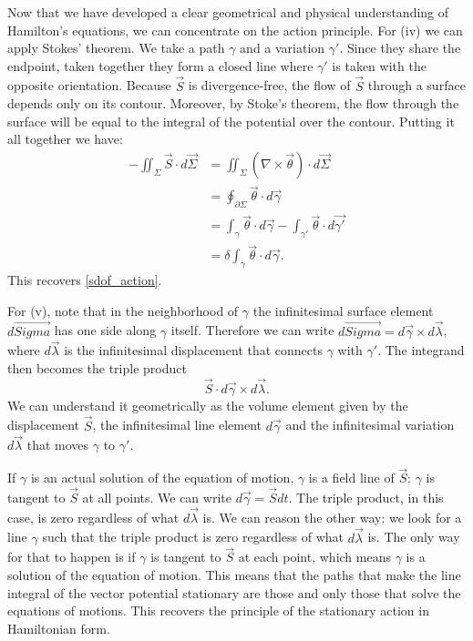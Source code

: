 \documentclass[10pt,twocolumn, nofootinbib]{revtex4-2}
\begin{document}
Now that we have developed a clear geometrical and physical understanding of Hamilton's equations, we can concentrate on the action principle. For (iv) we can apply Stokes' theorem. We take a path $\gamma$ and a variation $\gamma'$. Since they share the endpoint, taken together they form a closed line where $\gamma'$ is taken with the opposite orientation. Because $\vec{S}$ is divergence-free, the flow of $\vec{S}$ through a surface depends only on its contour. Moreover, by Stoke's theorem, the flow through the surface will be equal to the integral of the potential over the contour. Putting it all together we have:
\begin{align*}
	- \iint_{\Sigma} \vec{S} \cdot d\vec{\Sigma} &=
	\iint_{\Sigma} \left( \nabla \times \vec{\theta} \right) \cdot d\vec{\Sigma} \\
	&= \oint_{\partial \Sigma} \vec{\theta}  \cdot d\vec{\gamma} \\
	&= \int_{\gamma} \vec{\theta} \cdot d\vec{\gamma} - \int_{\gamma'} \vec{\theta} \cdot d\vec{\gamma'} \\
	&= \delta \int_{\gamma} \vec{\theta} \cdot d\vec{\gamma}.
\end{align*}
This recovers \ref{sdof_action}.

For (v), note that in the neighborhood of $\gamma$ the infinitesimal surface element $d\vec{Sigma}$ has one side along $\gamma$ itself. Therefore we can write $d\vec{Sigma} = d\vec{\gamma} \times d\vec{\lambda}$, where $d\vec{\lambda}$ is the infinitesimal displacement that connects $\gamma$ with $\gamma'$. The integrand then becomes the triple product
\begin{equation*}
	\vec{S} \cdot d\vec{\gamma} \times d\vec{\lambda}.
\end{equation*}
We can understand it geometrically as the volume element given by the displacement $\vec{S}$, the infinitesimal line element $d\vec{\gamma}$ and the infinitesimal variation $d\vec{\lambda}$ that moves $\gamma$ to $\gamma'$.

If $\gamma$ is an actual solution of the equation of motion, $\gamma$ is a field line of $\vec{S}$: $\gamma$ is tangent to $\vec{S}$ at all points. We can write $d\vec{\gamma} = \vec{S} dt$. The triple product, in this case, is zero regardless of what $d\vec{\lambda}$ is. We can reason the other way: we look for a line $\gamma$ such that the triple product is zero regardless of what $d\vec{\lambda}$ is. The only way for that to happen is if $\gamma$ is tangent to $\vec{S}$ at each point, which means $\gamma$ is a solution of the equation of motion. This means that the paths that make the line integral of the vector potential stationary are those and only those that solve the equations of motions. This recovers the principle of the stationary action in Hamiltonian form.
\end{document}
